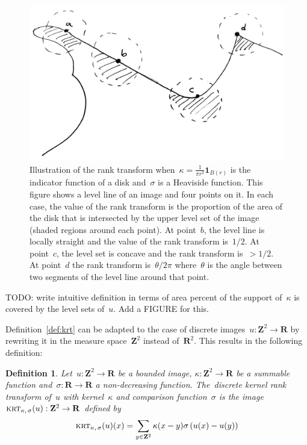 \documentclass[12pt]{article}                  %
\newtheorem{definition}{Definition}
\def\parens#1{\left(#1\right)}
\begin{document}
\begin{figure}
	\centering
	\includegraphics[width=0.6\linewidth]{f/figure1.png}
	\caption{
		Illustration of the rank transform
		when~$\kappa=\frac1{\pi r^2}\mathbf{1}_{B(r)}$ is the
		indicator function of a disk and~$\sigma$ is a Heaviside
		function.
		This figure shows a level line of an image and four points
		on it.  In each case, the value of the rank transform is the
		proportion of the area of the disk that is intersected by
		the upper level set of the image (shaded regions around each
		point).
		At point~$b$, the level line is locally straight and the
		value of the rank transform is~$1/2$.  At point~$c$, the
		level set is concave and the rank transform is~$>1/2$.  At
		point~$d$ the rank transform is~$\theta/{2\pi}$
		where~$\theta$ is the angle between two segments of the
		level line around that point.
	}
	\label{fig:figure1}
\end{figure}

TODO: write intuitive definition in terms of area percent of the support
of~$\kappa$ is covered by the level sets of~$u$.  Add a FIGURE for this.

Definition~\ref{def:krt} can be adapted to the case of discrete
images~$u:\mathbf{Z}^2\to\mathbf{R}$ by rewriting it in the measure
space~$\mathbf{Z}^2$ instead of~$\mathbf{R}^2$.  This results in the
following definition:

\begin{definition}\label{def:dkrt}
Let~$u:\mathbf{Z}^2\to\mathbf{R}$ be a bounded image,
$\kappa:\mathbf{Z}^2\to\mathbf{R}$ be a summable function
and~$\sigma:\mathbf{R}\to\mathbf{R}$ a non-decreasing function.
The~\emph{discrete kernel rank transform of~$u$ with kernel~$\kappa$
and comparison function~$\sigma$} is the
image~$\textsc{krt}_{\kappa,\,\sigma}(u):\mathbf{Z}^2\to\mathbf{R}$
defined by \begin{equation}\label{eq:rtdef}
	\textsc{krt}_{\kappa,\,\sigma}(u)(x) = \sum_{y\in\mathbf{Z}^2}\kappa(x-y)\sigma\parens{u(x)-u(y)}
\end{equation}
\end{definition}
\end{document}

